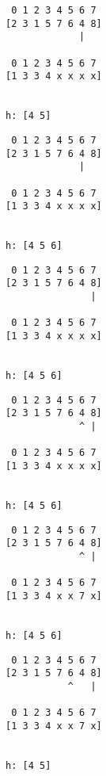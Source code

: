 { \begin{verbatim}
                    0 1 2 3 4 5 6 7
                   [2 3 1 5 7 6 4 8]
                                |

                    0 1 2 3 4 5 6 7
                   [1 3 3 4 x x x x]


                   h: [4 5]
\end{verbatim} }

{ \begin{verbatim}
                    0 1 2 3 4 5 6 7
                   [2 3 1 5 7 6 4 8]
                                |

                    0 1 2 3 4 5 6 7
                   [1 3 3 4 x x x x]


                   h: [4 5 6]
\end{verbatim} }

{ \begin{verbatim}
                    0 1 2 3 4 5 6 7
                   [2 3 1 5 7 6 4 8]
                                  |

                    0 1 2 3 4 5 6 7
                   [1 3 3 4 x x x x]


                   h: [4 5 6]
\end{verbatim} }

{ \begin{verbatim}
                    0 1 2 3 4 5 6 7
                   [2 3 1 5 7 6 4 8]
                                ^ |

                    0 1 2 3 4 5 6 7
                   [1 3 3 4 x x x x]


                   h: [4 5 6]
\end{verbatim} }

{ \begin{verbatim}
                    0 1 2 3 4 5 6 7
                   [2 3 1 5 7 6 4 8]
                                ^ |

                    0 1 2 3 4 5 6 7
                   [1 3 3 4 x x 7 x]


                   h: [4 5 6]
\end{verbatim} }

{ \begin{verbatim}
                    0 1 2 3 4 5 6 7
                   [2 3 1 5 7 6 4 8]
                              ^   |

                    0 1 2 3 4 5 6 7
                   [1 3 3 4 x x 7 x]


                   h: [4 5]
\end{verbatim} }

